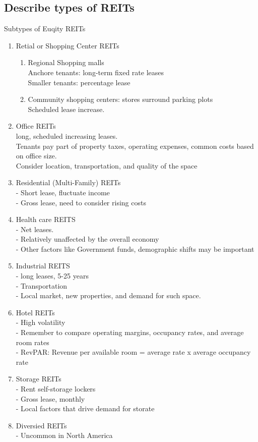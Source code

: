 \documentclass{article}
\newcommand{\be}{\begin{enumerate}}
\newcommand{\ee}{\end{enumerate}}
\begin{document}
\subsection{Describe types of REITs}
Subtypes of Euqity REITs
\be
    \item Retial or Shopping Center REITs
    \be
    \item Regional Shopping malls
    \\ Anchore tenants: long-term fixed rate leases
    \\ Smaller tenants: percentage lease
    \item Community shopping centers: stores surround parking plots
    \\ Scheduled lease increase.
    \ee
    \item Office REITs
    \\ long, scheduled increasing leases.
    \\ Tenants pay part of property taxes, operating expenses, common  costs based on office size.
    \\ Consider location, transportation, and quality of the space
    \item Residential (Multi-Family) REITs
    \\- Short lease, fluctuate income
    \\- Gross lease, need to consider rising costs
    \item Health care REITS
    \\- Net leases. 
    \\- Relatively unaffected by the overall economy
    \\- Other factors like Government funds, demographic shifts may be important
    \item Industrial REITS
    \\- long leases, 5-25 years
    \\- Transportation
    \\- Local market, new properties, and demand for such space.
    \item Hotel REITs
    \\-  High volatility
    \\- Remember to compare operating margins, occupancy rates, and average room rates
    \\- RevPAR: Revenue per available room = average rate x average occupancy rate
    \item Storage REITs
    \\- Rent self-storage lockers
    \\- Gross lease, monthly
    \\- Local factors that drive demand for storate
    \item Diversied REITs
    \\- Uncommon in North America
\ee
\end{document}
